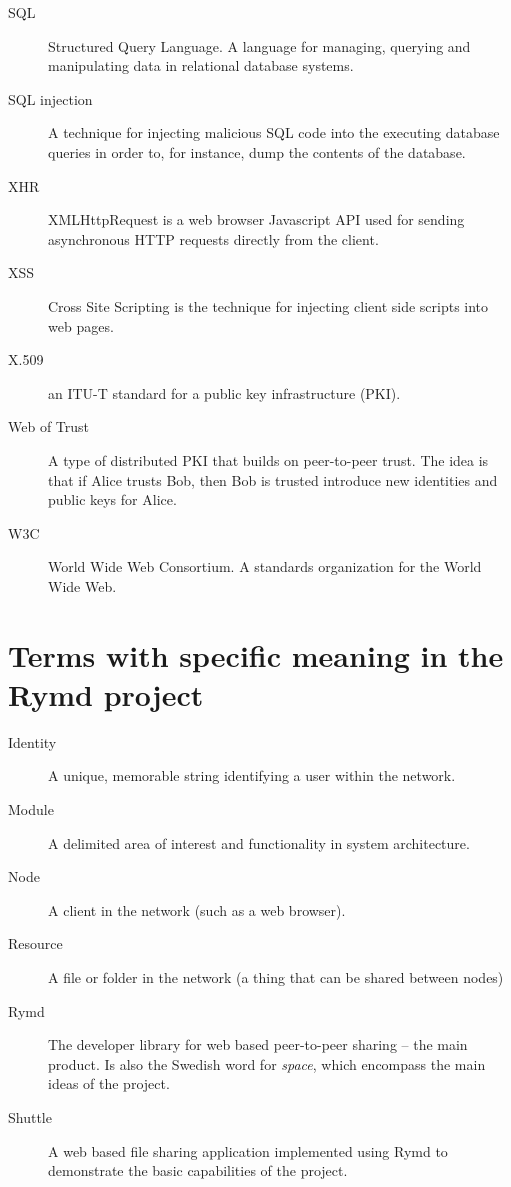 \begin{description}
  \item[SQL] Structured Query Language. A language for managing, querying and manipulating data in relational database systems.
  \item[SQL injection] A technique for injecting malicious SQL code into the executing database queries in order to, for instance, dump the contents of the database.
  \item[XHR] XMLHttpRequest is a web browser Javascript API used for sending asynchronous HTTP requests directly from the client.
  \item[XSS] Cross Site Scripting is the technique for injecting client side scripts into web pages.
  \item[X.509] an ITU-T standard for a public key infrastructure (PKI).
  \item[Web of Trust] A type of distributed PKI that builds on peer-to-peer trust. The idea is that if Alice trusts Bob, then Bob is trusted introduce new identities and public keys for Alice.
  \item[W3C] World Wide Web Consortium. A standards organization for the World Wide Web.

\end{description}

\section*{Terms with specific meaning in the Rymd project}
\begin{description}
  \item[Identity] A unique, memorable string identifying a user within the network.
  \item[Module] A delimited area of interest and functionality in system architecture.
  \item[Node] A client in the network (such as a web browser).
  \item[Resource] A file or folder in the network (a thing that can be shared between nodes)
  \item[Rymd] The developer library for web based peer-to-peer sharing – the main product. Is also the Swedish word for \emph{space}, which encompass the main ideas of the project.
  \item[Shuttle] A web based file sharing application implemented using Rymd to demonstrate the basic capabilities of the project.
\end{description}
